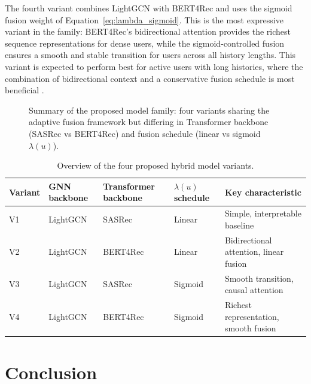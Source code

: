 \documentclass[12pt,a4paper]{report}
\begin{document}
The fourth variant combines LightGCN with BERT4Rec and uses the sigmoid
fusion weight of Equation~\ref{eq:lambda_sigmoid}. This is the most expressive
variant in the family: BERT4Rec's bidirectional attention provides the richest
sequence representations for dense users, while the sigmoid-controlled fusion
ensures a smooth and stable transition for users across all history lengths.
This variant is expected to perform best for active users with long histories,
where the combination of bidirectional context and a conservative fusion
schedule is most beneficial \citep{sun2019bert4rec, he2020lightgcn}.

\begin{figure}[h]
    \centering
    \caption{Summary of the proposed model family: four variants sharing the
    adaptive fusion framework but differing in Transformer backbone (SASRec
    vs BERT4Rec) and fusion schedule (linear vs sigmoid \(\lambda(u)\)).}
    \label{fig:model_family}
\end{figure}

\begin{table}[h]
\centering
\caption{Overview of the four proposed hybrid model variants.}
\label{tab:model_family}
\begin{tabular}{p{1.2cm} p{2.8cm} p{3.2cm} p{2.8cm} p{3.0cm}}
\toprule
\textbf{Variant} & \textbf{GNN backbone} & \textbf{Transformer backbone} & \textbf{\(\lambda(u)\) schedule} & \textbf{Key characteristic} \\
\midrule
V1 & LightGCN & SASRec  & Linear  & Simple, interpretable baseline \\
V2 & LightGCN & BERT4Rec & Linear  & Bidirectional attention, linear fusion \\
V3 & LightGCN & SASRec  & Sigmoid & Smooth transition, causal attention \\
V4 & LightGCN & BERT4Rec & Sigmoid & Richest representation, smooth fusion \\
\bottomrule
\end{tabular}
\end{table}

\section{Conclusion}
\label{sec:ch2conclusion}
\end{document}
